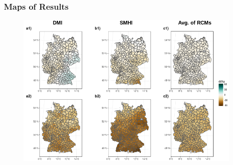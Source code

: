 \documentclass[12pt]{iopart}
\begin{document}
\subsubsection{Maps of Results}
\begin{figure}
	\label{map:1f}
	\centering
	\includegraphics[width=1\textwidth]{figures/plot_mean_yield_SMI_6_Jun_Aug_ExtremesAndAvg.png}
	\caption{}
\end{figure}
\end{document}

